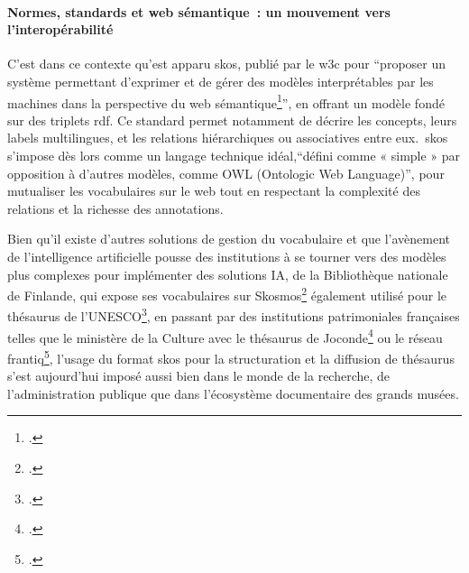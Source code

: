 \paragraph*{Normes, standards et web sémantique~: un mouvement vers l’interopérabilité}
C’est dans ce contexte qu'est apparu \gls{skos}, publié par le \ac{w3c} pour \enquote{proposer un système permettant d’exprimer et de gérer des modèles interprétables par les machines dans la perspective du web sémantique\footcite{lenartSKOSLangageRepresentation2007}}, en offrant un modèle fondé sur des triplets \gls{rdf}. Ce standard permet notamment de décrire les concepts, leurs labels multilingues, et les relations hiérarchiques ou associatives entre eux.  \gls{skos} s’impose dès lors comme un langage technique idéal,\enquote{défini comme « simple » par opposition à d’autres modèles, comme OWL (Ontologic Web Language)}, pour mutualiser les vocabulaires sur le web tout en respectant la complexité des relations et la richesse des annotations. 

Bien qu'il existe d'autres solutions de gestion du vocabulaire et que l'avènement de l'intelligence artificielle pousse des institutions à se tourner vers des modèles plus complexes pour implémenter des solutions IA, de la Bibliothèque nationale de Finlande, qui expose ses vocabulaires sur Skosmos\footcite{Skosmos} également utilisé pour le thésaurus de l’UNESCO\footcite{unescoThesaurusLUNESCO1977}, en passant par des institutions patrimoniales françaises telles que le ministère de la Culture avec le thésaurus de Joconde\footcite{ministeredelacultureListeDautoriteDenomination} ou le réseau \ac{frantiq}\footcite{Pactols}, l’usage du format \ac{skos} pour la structuration et la diffusion de thésaurus s’est aujourd’hui imposé aussi bien dans le monde de la recherche, de l’administration publique que dans l’écosystème documentaire des grands musées.

